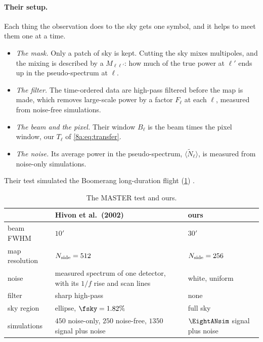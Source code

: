 \paragraph{Their setup.}
Each thing the observation does to the sky gets one symbol, and it helps to meet them one at a
time.
\begin{itemize}
  \item \emph{The mask.} Only a patch of sky is kept. Cutting the sky mixes multipoles, and the
        mixing is described by a  $M_{\ell\ell'}$: how much of the true
        power at $\ell'$ ends up in the pseudo-spectrum at $\ell$.
  \item \emph{The filter.} The time-ordered data are high-pass filtered before the map is made,
        which removes large-scale power by a factor $F_\ell$ at each $\ell$, measured from noise-free
        simulations.
  \item \emph{The beam and the pixel.} Their window $B_\ell$ is the beam times the pixel window, our
        $T_\ell$ of \eqref{8a:eq:transfer}.
  \item \emph{The noise.} Its average power in the pseudo-spectrum, $\langle\tilde N_\ell\rangle$, is
        measured from noise-only simulations.
\end{itemize}
Their test simulated the Boomerang long-duration flight (\cref{8a:tab:hivon-setup})
.

\begin{table}[htbp]
\centering
\small
\renewcommand{\arraystretch}{1.2}
\begin{tabular}{@{}>{\raggedright\arraybackslash}p{3.0cm}>{\raggedright\arraybackslash}p{4.6cm}>{\raggedright\arraybackslash}p{4.4cm}@{}}
\hline
 & Hivon et al.\ (2002) & ours \\
\hline
beam FWHM & $10'$ & $30'$ \\
map resolution & $N_{\rm side}=512$ & $N_{\rm side}=256$ \\
noise & measured spectrum of one detector, with its $1/f$ rise and scan lines & white, uniform \\
filter & sharp high-pass & none \\
sky region & ellipse, $\fsky=1.82\%$ & full sky \\
simulations & $450$ noise-only, $250$ noise-free, $1350$ signal plus noise & $\EightANsim$ signal plus noise \\
\hline
\end{tabular}
\caption{The MASTER test and ours.}
\label{8a:tab:hivon-setup}
\end{table}

